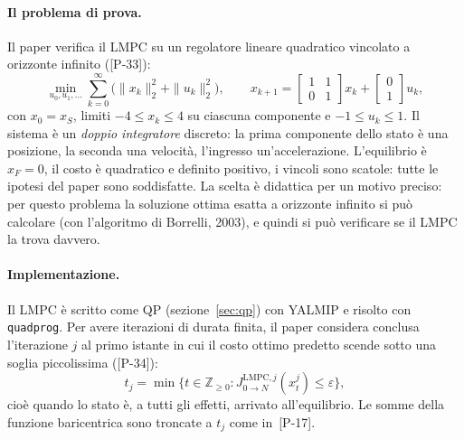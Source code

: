 \documentclass[11pt,a4paper]{article}
\theoremstyle{definition}
\theoremstyle{plain}
\theoremstyle{remark}
\newcommand{\Zn}{\mathbb{Z}_{\ge 0}}
\newcommand{\JL}{J^{\mathrm{LMPC},j}_{0\to N}}
\newcommand{\eqp}[1]{\textup{[P-#1]}}   %
\begin{document}
\paragraph{Il problema di prova.}
Il paper verifica il LMPC su un regolatore lineare quadratico vincolato a
orizzonte infinito (\eqp{33}):
\[
  \min_{u_0,u_1,\dots}\sum_{k=0}^{\infty}\big(\|x_k\|_2^2+\|u_k\|_2^2\big),
  \qquad
  x_{k+1}=\begin{bmatrix}1&1\\0&1\end{bmatrix}x_k+\begin{bmatrix}0\\1\end{bmatrix}u_k,
\]
con $x_0=x_S$, limiti $-4\le x_k\le 4$ su ciascuna componente e $-1\le u_k\le 1$.
Il sistema è un \emph{doppio integratore} discreto: la prima componente dello
stato è una posizione, la seconda una velocità, l'ingresso un'accelerazione.
L'equilibrio è $x_F=0$, il costo è quadratico e definito positivo, i vincoli
sono scatole: tutte le ipotesi del paper sono soddisfatte. La scelta è
didattica per un motivo preciso: per questo problema la soluzione ottima
esatta a orizzonte infinito si può calcolare (con l'algoritmo di Borrelli,
2003), e quindi si può verificare se il LMPC la trova davvero.

\paragraph{Implementazione.}
Il LMPC è scritto come QP (sezione~\ref{sec:qp}) con YALMIP e risolto con
\texttt{quadprog}. Per avere iterazioni di durata finita, il paper considera
conclusa l'iterazione $j$ al primo istante in cui il costo ottimo predetto
scende sotto una soglia piccolissima (\eqp{34}):
\[
  t_j = \min\big\{t\in\Zn : \JL(x^j_t)\le\varepsilon\big\},
\]
cioè quando lo stato è, a tutti gli effetti, arrivato all'equilibrio. Le
somme della funzione baricentrica sono troncate a $t_j$ come
in~\eqp{17}.
\end{document}
